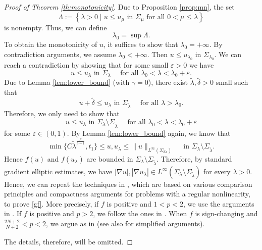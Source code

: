 \documentclass[reqno]{amsart}
\theoremstyle{plain}
\theoremstyle{definition}
\theoremstyle{remark}
\begin{document}
	\begin{proof}[Proof of Theorem \ref{th:monotonicity}]	
		Due to Proposition \ref{prop:mn}, the set
		\[
		\Lambda:=\left\{\lambda>0 \mid u\leq u_\mu \text{ in } \Sigma_\mu \text{ for all } 0<\mu\leq \lambda\right\}
		\]
		is nonempty. Thus, we can define
		\begin{equation}\label{lambda}
			\lambda_0=\sup\Lambda.
		\end{equation}
		To obtain the monotonicity of $u$, it suffices to show that $\lambda_0=+\infty$. By contradiction arguments, we assume $\lambda_0<+\infty$. Then $u\leq u_{\lambda_0}$ in $\Sigma_{\lambda_0}$. We can reach a contradiction by showing that for some small $\varepsilon>0$ we have
		\[
		u\leq u_\lambda \text{ in } \Sigma_\lambda \quad\text{ for all } \lambda_0 < \lambda<\lambda_0 + \varepsilon.
		\]
		Due to Lemma \ref{lem:lower_bound} (with $\gamma=0$), there exist $\tilde{\lambda}, \tilde{\delta}>0$ small such that
		\[
		u+\tilde{\delta}\leq u_\lambda \text{ in } \Sigma_{\tilde{\lambda}} \quad\text{ for all } \lambda>\lambda_0.
		\]
		Therefore, we only need to show that
		\begin{equation}\label{gf}
			u\leq u_\lambda \text{ in } \Sigma_\lambda\setminus\Sigma_{\tilde{\lambda}} \quad\text{ for all } \lambda_0 < \lambda<\lambda_0 + \varepsilon
		\end{equation}
		for some $\varepsilon\in(0,1)$.
		By Lemma \ref{lem:lower_bound} again, we know that
		\[
		\min\{C \tilde{\lambda}^\frac{p}{p-1}, t_1\} \le u, u_\lambda \le \|u\|_{L^\infty(\Sigma_{2\lambda})} \quad\text{ in } \Sigma_\lambda\setminus\Sigma_{\tilde{\lambda}}.
		\]
		Hence $f(u)$ and $f(u_\lambda)$ are bounded in $\Sigma_\lambda\setminus\Sigma_{\tilde{\lambda}}$. Therefore, by standard gradient elliptic estimates, we have $|\nabla u|, |\nabla u_\lambda| \in L^\infty(\Sigma_\lambda\setminus\Sigma_{\tilde{\lambda}})$ for every $\lambda>0$. Hence, we can repeat the techniques in \cite{MR3303939,MR2886112,MR3752525,MR3118616,MR4439897}, which are based on various comparison principles and compactness arguments for problems with a regular nonlinearity, to prove \eqref{gf}. More precisely, if $f$ is positive and $1<p<2$, we use the arguments in \cite{MR3303939}. If $f$ is positive and $p>2$, we follow the ones in \cite{MR3118616}. When $f$ is sign-changing and \( \frac{2N+2}{N+2}<p<2 \), we argue as in \cite{MR4439897} (see also \cite{MR4750390,10.1007/s11118-024-10157-1} for simplified arguments).
		
		The details, therefore, will be omitted.
	\end{proof}
	
\end{document}
